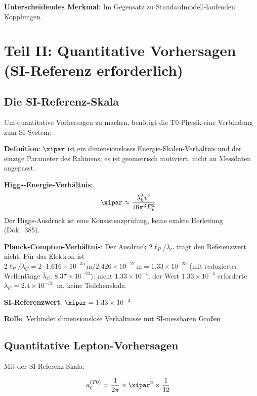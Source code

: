 	\textbf{Unterscheidendes Merkmal}: Im Gegensatz zu Standardmodell-laufenden Kopplungen.

	\section{Teil II: Quantitative Vorhersagen (SI-Referenz erforderlich)}
	
	\subsection{Die SI-Referenz-Skala}
	
	Um quantitative Vorhersagen zu machen, benötigt die T0-Physik eine Verbindung zum SI-System:
	
	\begin{tcolorbox}[colback=green!5!white,colframe=green!75!black,title=SI-Referenz-Skala]
		\textbf{Definition}: $\xipar$ ist ein dimensionsloses Energie-Skalen-Verhältnis und der einzige Parameter des Rahmens; es ist geometrisch motiviert, nicht an Messdaten angepasst.
		
		\textbf{Higgs-Energie-Verhältnis}:
		\begin{equation}
			\xipar \approx \frac{\lambda_h^2 v^2}{16\pi^3 E_h^2}
		\end{equation}
		Der Higgs-Ausdruck ist eine Konsistenzprüfung, keine exakte Herleitung (Dok.~385).
		
		\textbf{Planck-Compton-Verhältnis}: Der Ausdruck $2\ell_P/\lambda_C$ trägt den Referenzwert nicht. Für das Elektron ist $2\ell_P/\lambda_C = 2 \cdot 1.616\times10^{-35}\,\text{m}/2.426\times10^{-12}\,\text{m} = 1.33\times10^{-23}$ (mit reduzierter Wellenlänge $\bar\lambda_C$: $8.37\times10^{-23}$), nicht $1.33\times10^{-4}$; der Wert $1.33\times10^{-4}$ erforderte $\lambda_C = 2.4\times10^{-31}$~m, keine Teilchenskala.
		
		\textbf{SI-Referenzwert}: $\xipar = 1.33 \times 10^{-4}$
		
		\textbf{Rolle}: Verbindet dimensionslose Verhältnisse mit SI-messbaren Größen
	\end{tcolorbox}
	
	\subsection{Quantitative Lepton-Vorhersagen}
	
	Mit der SI-Referenz-Skala:
	
	\begin{equation}
		a_{\ell}^{(T0)} = \frac{1}{2\pi} \times \xipar^2 \times \frac{1}{12}
		\label{eq:quantitative_lepton_correction}
	\end{equation}
	
